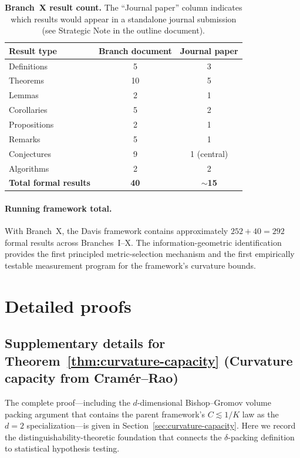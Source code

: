 \documentclass[11pt]{article}
\theoremstyle{remark}
\begin{document}
\begin{table}[htbp]
\centering
\caption{\textbf{Branch~X result count.}  The ``Journal paper'' column
indicates which results would appear in a standalone journal submission
(see Strategic Note in the outline document).}
\label{tab:result-count}
\begin{tabular}{lcc}
\toprule
\textbf{Result type} & \textbf{Branch document} & \textbf{Journal paper} \\
\midrule
Definitions & 5 & 3 \\
Theorems & 10 & 5 \\
Lemmas & 2 & 1 \\
Corollaries & 5 & 2 \\
Propositions & 2 & 1 \\
Remarks & 5 & 1 \\
Conjectures & 9 & 1 (central) \\
Algorithms & 2 & 2 \\
\midrule
\textbf{Total formal results} & \textbf{40} & $\sim$\textbf{15} \\
\bottomrule
\end{tabular}
\end{table}

\paragraph{Running framework total.}
With Branch~X, the Davis framework contains approximately $252 + 40 = 292$
formal results across Branches~I--X.  The information-geometric identification
provides the first principled metric-selection mechanism and the first
empirically testable measurement program for the framework's curvature bounds.


\appendix
\section{Detailed proofs}\label{sec:appendix}

\subsection{Supplementary details for Theorem~\ref{thm:curvature-capacity}
(Curvature capacity from Cram\'er--Rao)}
\label{subsec:proof-curvature-capacity}

The complete proof---including the $d$-dimensional Bishop--Gromov volume
packing argument that contains the parent framework's $C \lesssim 1/K$
law as the $d{=}2$ specialization---is given in Section~\ref{sec:curvature-capacity}.  Here we record the
distinguishability-theoretic foundation that connects the $\delta$-packing
definition to statistical hypothesis testing.
\end{document}
